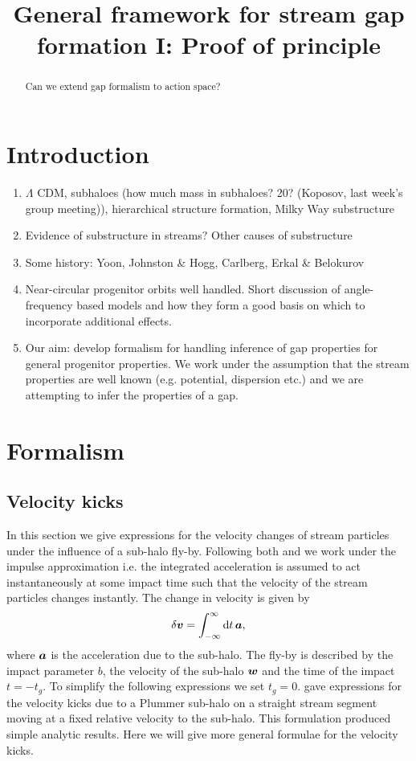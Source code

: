 \documentclass[useAMS,usenatbib,fleqn,a4paper]{mn2e}
\title{General framework for stream gap formation I: Proof of principle}
\def\d{{\rm d}}
\def\percent{\text{ per cent}}
\newcommand{\bs}[1]{\bmath{#1}}
\def\percent{\text{ per cent}}
\begin{document}
\maketitle
\label{firstpage}
\begin{abstract}
Can we extend gap formalism to action space?
\end{abstract}

\section{Introduction}
\begin{enumerate}
\item $\Lambda$ CDM, subhaloes (how much mass in subhaloes? 20\percent? (Koposov, last week's group meeting)), hierarchical structure formation, Milky Way substructure
\item Evidence of substructure in streams? Other causes of substructure
\item Some history: Yoon, Johnston \& Hogg, Carlberg, Erkal \& Belokurov
\item Near-circular progenitor orbits well handled. Short discussion of angle-frequency based models and how they form a good basis on which to incorporate additional effects.
\item Our aim: develop formalism for handling inference of gap properties for general progenitor properties. We work under the assumption that the stream properties are well known (e.g. potential, dispersion etc.) and we are attempting to infer the properties of a gap.
\end{enumerate}
\section{Formalism}
\subsection{Velocity kicks}
In this section we give expressions for the velocity changes of stream particles under the influence of a sub-halo fly-by. Following both \cite{YoonJohnstonHogg} and \cite{ErkalBelokurov} we work under the impulse approximation i.e. the integrated acceleration is assumed to act instantaneously at some impact time such that the velocity of the stream particles changes instantly. The change in velocity is given by
\begin{equation}
\delta\bs{v} = \int_{-\infty}^{\infty} \d t\,\bs{a},
\end{equation}
where $\bs{a}$ is the acceleration due to the sub-halo. The fly-by is described by the impact parameter $b$, the velocity of the sub-halo $\bs{w}$ and the time of the impact $t=-t_g$. To simplify the following expressions we set $t_g=0$. \cite{ErkalBelokurov} gave expressions for the velocity kicks due to a Plummer sub-halo on a straight stream segment moving at a fixed relative velocity to the sub-halo. This formulation produced simple analytic results. Here we will give more general formulae for the velocity kicks.
\end{document}
